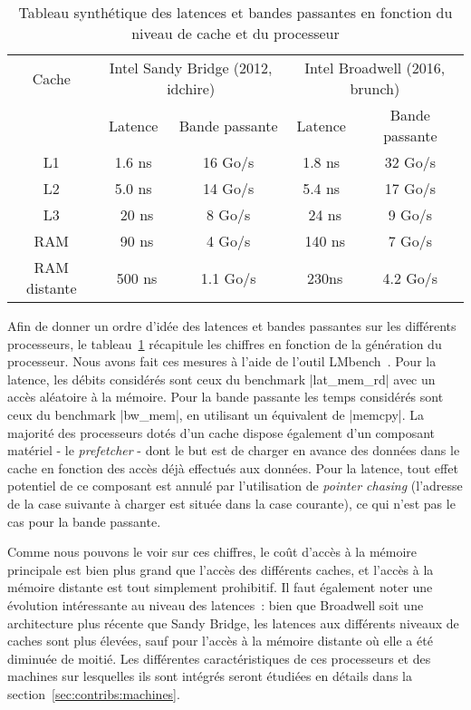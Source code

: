 \begin{table}[ht]
\def\arraystretch{1.5}
\centering
\begin{tabular}{|c||c|c|c|c|}\hline
  Cache & \multicolumn{2}{c|}{Intel Sandy Bridge (2012, idchire)} & \multicolumn{2}{c|}{Intel Broadwell (2016, brunch)}  \\ \cline{2-5}
 & Latence & Bande passante & Latence & Bande passante \\ \hline
 L1 & 1.6 ns & 16 Go/s & 1.8 ns & 32 Go/s \\ \hline
 L2 & 5.0 ns & 14 Go/s & 5.4 ns & 17 Go/s \\ \hline
 L3 & ~20 ns & 8 Go/s & ~24 ns & 9 Go/s \\ \hline
 RAM & ~90 ns & 4 Go/s & ~140 ns & 7 Go/s \\ \hline
 RAM distante & ~500 ns & 1.1 Go/s & ~230ns & 4.2 Go/s \\ \hline
\end{tabular}
\caption{Tableau synthétique des latences et bandes passantes en fonction du niveau de cache et du processeur}\label{tab:synthese-processeurs}
\end{table}

Afin de donner un ordre d'idée des latences et bandes passantes sur les différents processeurs, le tableau~\ref{tab:synthese-processeurs} récapitule les chiffres en fonction de la génération du processeur.
Nous avons fait ces mesures à l'aide de l'outil LMbench~\cite{McVoy1996}. Pour la latence, les débits considérés sont ceux du benchmark |lat_mem_rd| avec un accès aléatoire à la mémoire.
Pour la bande passante les temps considérés sont ceux du benchmark |bw_mem|, en utilisant un équivalent de |memcpy|.
La majorité des processeurs dotés d'un cache dispose également d'un composant matériel - le \emph{prefetcher} - dont le but est de charger en avance des données dans le cache en fonction des accès déjà effectués aux données.
Pour la latence, tout effet potentiel de ce composant est annulé par l'utilisation de \emph{pointer chasing} (l'adresse de la case suivante à charger est située dans la case courante), ce qui n'est pas le cas pour la bande passante.

Comme nous pouvons le voir sur ces chiffres, le coût d'accès à la mémoire principale est bien plus grand que l'accès des différents caches, et l'accès à la mémoire distante est tout simplement prohibitif.
Il faut également noter une évolution intéressante au niveau des latences~: bien que Broadwell soit une architecture plus récente que Sandy Bridge, les latences aux différents niveaux de caches sont plus élevées, sauf pour l'accès à la mémoire distante où elle a été diminuée de moitié.
Les différentes caractéristiques de ces processeurs et des machines sur lesquelles ils sont intégrés seront étudiées en détails dans la section~\ref{sec:contribs:machines}.


